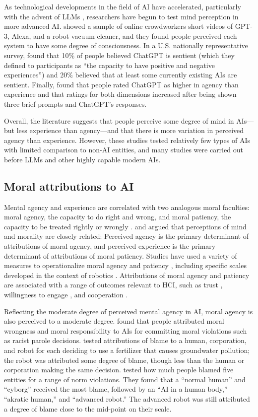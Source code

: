 As technological developments in the field of AI have accelerated, particularly with the advent of LLMs \cite{vaswani17}, researchers have begun to test mind perception in more advanced AI. \citet{scott23} showed a sample of online crowdworkers short videos of GPT-3, Alexa, and a robot vacuum cleaner, and they found people perceived each system to have some degree of consciousness. In a U.S. nationally representative survey, \citet{anthis24a} found that 10\% of people believed ChatGPT is sentient (which they defined to participants as “the capacity to have positive and negative experiences”) and 20\% believed that at least some currently existing AIs are sentient. Finally, \citet{jacobs23} found that people rated ChatGPT as higher in agency than experience and that ratings for both dimensions increased after being shown three brief prompts and ChatGPT’s responses.

Overall, the literature suggests that people perceive some degree of mind in AIs—but less experience than agency—and that there is more variation in perceived agency than experience. However, these studies tested relatively few types of AIs with limited comparison to non-AI entities, and many studies were carried out before LLMs and other highly capable modern AIs.

\subsection{Moral attributions to AI}

Mental agency and experience are correlated with two analogous moral faculties: moral agency, the capacity to do right and wrong, and moral patiency, the capacity to be treated rightly or wrongly \cite{gray07}. \citet{gray12} and \citet{gray12b} argued that perceptions of mind and morality are closely related: Perceived agency is the primary determinant of attributions of moral agency, and perceived experience is the primary determinant of attributions of moral patiency. Studies have used a variety of measures to operationalize moral agency and patiency \cite{ladak23a}, including specific scales developed in the context of robotics \cite{banks19, banks23}. Attributions of moral agency and patiency are associated with a range of outcomes relevant to HCI, such as trust \cite{wester24}, willingness to engage \cite{banks19}, and cooperation \cite{bonnefon24}.

Reflecting the moderate degree of perceived mental agency in AI, moral agency is also perceived to a moderate degree. \citet{shank18} found that people attributed moral wrongness and moral responsibility to AIs for committing moral violations such as racist parole decisions. \citet{stuart21} tested attributions of blame to a human, corporation, and robot for each deciding to use a fertilizer that causes groundwater pollution; the robot was attributed some degree of blame, though less than the human or corporation making the same decision. \citet{monroe14} tested how much people blamed five entities for a range of norm violations. They found that a “normal human” and “cyborg” received the most blame, followed by an “AI in a human body,” “akratic human,” and “advanced robot.” The advanced robot was still attributed a degree of blame close to the mid-point on their scale.

